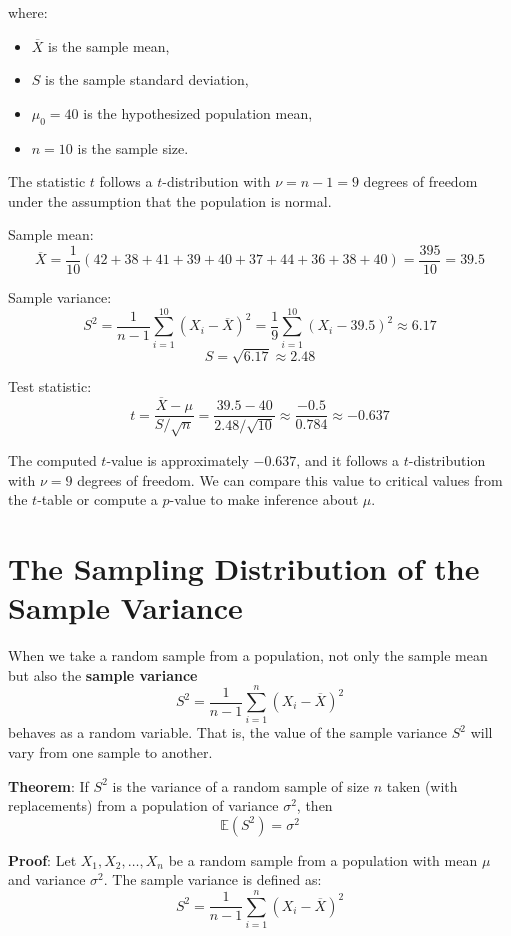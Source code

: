 \documentclass[twoside]{book}
\begin{document}
where:
\begin{itemize}
  \item \( \overline{X} \) is the sample mean,
  \item \( S \) is the sample standard deviation,
  \item \( \mu_0 = 40 \) is the hypothesized population mean,
  \item \( n = 10 \) is the sample size.
\end{itemize}

The statistic \( t \) follows a \( t \)-distribution with \( \nu = n - 1 = 9 \) degrees of freedom under the assumption that the population is normal.

Sample mean:
\[
\overline{X} = \frac{1}{10} (42 + 38 + 41 + 39 + 40 + 37 + 44 + 36 + 38 + 40) = \frac{395}{10} = 39.5
\]

Sample variance:
\[
S^2 = \frac{1}{n - 1} \sum_{i=1}^{10} (X_i - \overline{X})^2 = \frac{1}{9} \sum_{i=1}^{10} (X_i - 39.5)^2 \approx 6.17
\]
\[
S = \sqrt{6.17} \approx 2.48
\]

Test statistic:
\[
t = \frac{\overline{X} - \mu}{S / \sqrt{n}} = \frac{39.5 - 40}{2.48 / \sqrt{10}} \approx \frac{-0.5}{0.784} \approx -0.637
\]

The computed \( t \)-value is approximately \( -0.637 \), and it follows a \( t \)-distribution with \( \nu = 9 \) degrees of freedom. We can compare this value to critical values from the \( t \)-table or compute a \( p \)-value to make inference about \( \mu \).

\section{The Sampling Distribution of the Sample Variance}
When we take a random sample from a population, not only the sample mean but also the \textbf{sample variance}
\[
S^2 = \frac{1}{n - 1} \sum_{i=1}^{n} (X_i - \overline{X})^2
\]
behaves as a random variable. That is, the value of the sample variance \( S^2 \) will vary from one sample to another.

\begin{textbox}
\textbf{Theorem}: If $S^2$ is the variance of a random sample of size $n$ taken (with replacements) from a population of variance $\sigma^2$, then
\[
\mathbb{E}(S^2) = \sigma^2
\]
\end{textbox}

\textbf{Proof}: Let \( X_1, X_2, \dots, X_n \) be a random sample from a population with mean \( \mu \) and variance \( \sigma^2 \). The sample variance is defined as:
\[
S^2 = \frac{1}{n - 1} \sum_{i=1}^{n} (X_i - \overline{X})^2
\]
\end{document}
